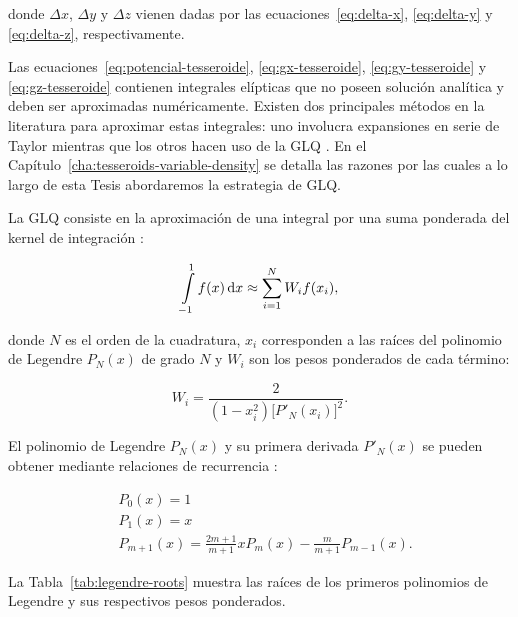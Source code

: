 \noindent donde $\Delta x$, $\Delta y$ y $\Delta z$ vienen dadas por las
ecuaciones~\ref{eq:delta-x}, \ref{eq:delta-y} y \ref{eq:delta-z},
respectivamente.

Las ecuaciones~\ref{eq:potencial-tesseroide}, \ref{eq:gx-tesseroide},
\ref{eq:gy-tesseroide} y \ref{eq:gz-tesseroide} contienen integrales elípticas
que no poseen solución analítica y deben ser aproximadas numéricamente.
Existen dos principales métodos en la literatura para aproximar estas
integrales: uno involucra expansiones en serie de Taylor
\citep{heck2006,grombein2013} mientras que los otros hacen uso de la \ac{GLQ}
\citep{asgharzadeh2007,wildpfeiffer2008,li2011,uieda2016,lin2018}.
En el Capítulo~\ref{cha:tesseroids-variable-density} se detalla las razones por
las cuales a lo largo de esta Tesis abordaremos la estrategia de \ac{GLQ}.

La \Ac{GLQ} consiste en la aproximación de una integral por una suma ponderada
del kernel de integración \citep[][p.~390]{hildebrand1987}:

\begin{equation}
    \int\limits_{-1}^1 f(x) \mathop{}\!\textnormal{d} x \approx
        \sum\limits_{i=1}^{N} W_i f(x_i),
\end{equation}

\noindent donde $N$ es el orden de la cuadratura,
$x_i$ corresponden a las raíces del polinomio de Legendre $P_N(x)$ de grado $N$
y $W_i$ son los pesos ponderados de cada término:

\begin{equation}
    W_i = \frac{2}{(1 - x_i^2) \Big[ P'_N(x_i) \Big]^2}.
\end{equation}

\noindent El polinomio de Legendre $P_N(x)$ y su primera derivada $P'_N(x)$ se
pueden obtener mediante relaciones de recurrencia \citep[][p.~330]{hildebrand1987}:

\begin{align}
    &P_0(x) = 1 \\
    &P_1(x) = x \\
    &P_{m + 1}(x) = \frac{2m + 1}{m + 1} x P_m(x) - \frac{m}{m + 1}P_{m-1}(x).
\end{align}

La Tabla~\ref{tab:legendre-roots} muestra las raíces de los primeros polinomios
de Legendre y sus respectivos pesos ponderados.

